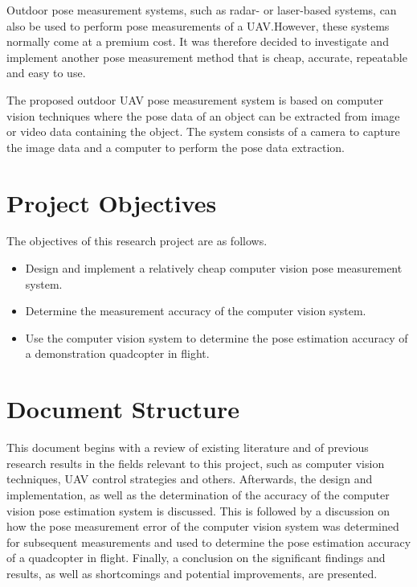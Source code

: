 Outdoor pose measurement systems, such as radar- or laser-based systems, can also be used to perform pose measurements of a UAV.\@ However, these systems normally come at a premium cost. It was therefore decided to investigate and implement another pose measurement method that is cheap, accurate, repeatable and easy to use. 

The proposed outdoor UAV pose measurement system is based on computer vision techniques where the pose data of an object can be extracted from image or video data containing the object. The system consists of a camera to capture the image data and a computer to perform the pose data extraction. 

\section{Project Objectives}

The objectives of this research project are as follows. 

\begin{itemize}
  \item Design and implement a relatively cheap computer vision pose measurement system.
  \item Determine the measurement accuracy of the computer vision system.
  \item Use the computer vision system to determine the pose estimation accuracy of a demonstration quadcopter in flight. 
\end{itemize}

\section{Document Structure}

This document begins with a review of existing literature and of previous research results in the fields relevant to this project, such as computer vision techniques, UAV control strategies and others. Afterwards, the design and implementation, as well as the determination of the accuracy of the computer vision pose estimation system is discussed. This is followed by a discussion on how the pose measurement error of the computer vision system was determined for subsequent measurements and used to determine the pose estimation accuracy of a quadcopter in flight. Finally, a conclusion on the significant findings and results, as well as shortcomings and potential improvements, are presented. 

